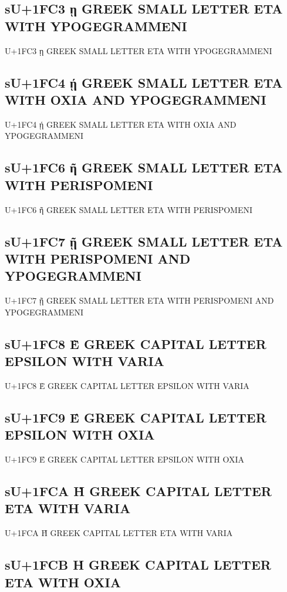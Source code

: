 \subsection{sU+1FC3 ῃ GREEK SMALL LETTER ETA WITH YPOGEGRAMMENI}

U+1FC3 ῃ GREEK SMALL LETTER ETA WITH YPOGEGRAMMENI

\subsection{sU+1FC4 ῄ GREEK SMALL LETTER ETA WITH OXIA AND YPOGEGRAMMENI}

U+1FC4 ῄ GREEK SMALL LETTER ETA WITH OXIA AND YPOGEGRAMMENI

\subsection{sU+1FC6 ῆ GREEK SMALL LETTER ETA WITH PERISPOMENI}

U+1FC6 ῆ GREEK SMALL LETTER ETA WITH PERISPOMENI

\subsection{sU+1FC7 ῇ GREEK SMALL LETTER ETA WITH PERISPOMENI AND YPOGEGRAMMENI}

U+1FC7 ῇ GREEK SMALL LETTER ETA WITH PERISPOMENI AND YPOGEGRAMMENI

\subsection{sU+1FC8 Ὲ GREEK CAPITAL LETTER EPSILON WITH VARIA}

U+1FC8 Ὲ GREEK CAPITAL LETTER EPSILON WITH VARIA

\subsection{sU+1FC9 Έ GREEK CAPITAL LETTER EPSILON WITH OXIA}

U+1FC9 Έ GREEK CAPITAL LETTER EPSILON WITH OXIA

\subsection{sU+1FCA Ὴ GREEK CAPITAL LETTER ETA WITH VARIA}

U+1FCA Ὴ GREEK CAPITAL LETTER ETA WITH VARIA

\subsection{sU+1FCB Ή GREEK CAPITAL LETTER ETA WITH OXIA}

